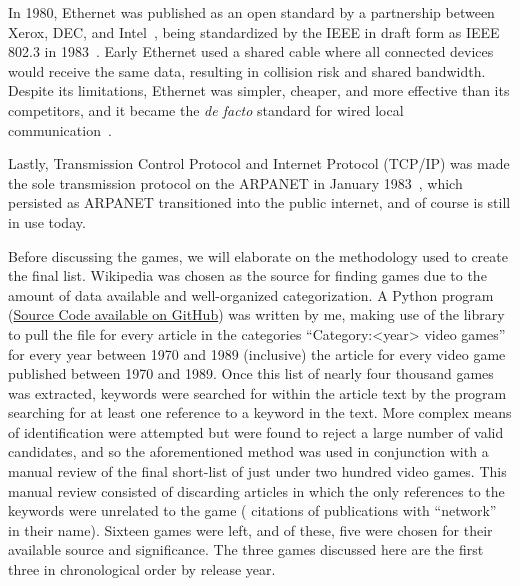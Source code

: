 In 1980, Ethernet was published as an open standard by a partnership between Xerox, DEC, and Intel~\cite{DIX}, being standardized by the IEEE in draft form as IEEE 802.3 in 1983~\cite{IEEE8023}. Early Ethernet used a shared cable where all connected devices would receive the same data, resulting in collision risk and shared bandwidth. Despite its limitations, Ethernet was simpler, cheaper, and more effective than its competitors, and it became the \textit{de facto} standard for wired local communication~\cite{metcalfe}.

Lastly, Transmission Control Protocol and Internet Protocol (TCP/IP) was made the sole transmission protocol on the ARPANET in January 1983~\cite{flagday}, which persisted as ARPANET transitioned into the public internet, and of course is still in use today.

Before discussing the games, we will elaborate on the methodology used to create the final list. Wikipedia was chosen as the source for finding games due to the amount of data available and well-organized categorization. A Python program (\href{https://github.com/Anidion/wikipedia-scraper}{Source Code available on GitHub}) was written by me, making use of the  library~\cite{pywikibot} to pull the  file for every article in the categories ``Category:<year> video games'' for every year between 1970 and 1989 (inclusive) \ie{} the article for every video game published between 1970 and 1989. Once this list of nearly four thousand games was extracted, keywords were searched for within the article text by the program searching for at least one reference to a keyword in the text. More complex means of identification were attempted but were found to reject a large number of valid candidates, and so the aforementioned method was used in conjunction with a manual review of the final short-list of just under two hundred video games. This manual review consisted of discarding articles in which the only references to the keywords were unrelated to the game (\eg{} citations of publications with ``network'' in their name). Sixteen games were left, and of these, five were chosen for their available source and significance. The three games discussed here are the first three in chronological order by release year.
